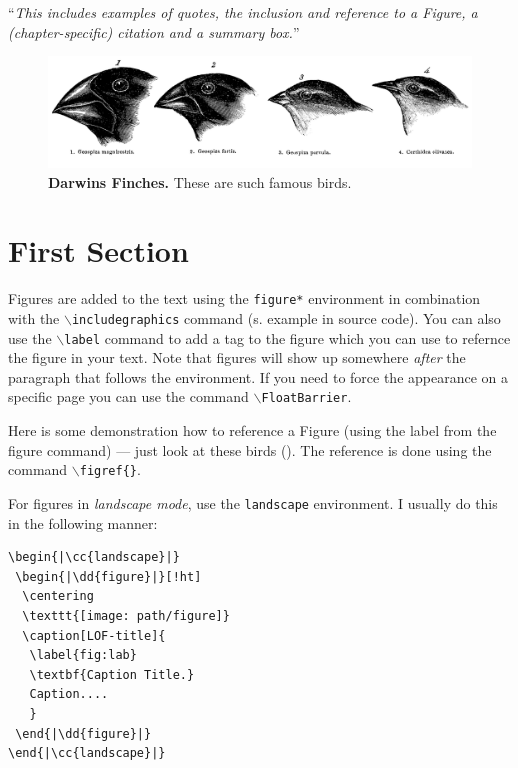 ``\textit{This includes examples of quotes, the inclusion and reference to a Figure, a (chapter-specific) citation and a summary box.}''\\

\begin{multicols}{2}
\begin{figure}[!hb] %
\centering
\includegraphics[width = \fwidth]{figures/ci/finches.png}
\caption[Darwins Finches]{\label{fig:cif1}\textbf{Darwins Finches.} These are such famous birds.
}
\end{figure}

\section{First Section}

Figures are added to the text using the \texttt{figure*} environment in combination with the \texttt{$\backslash$includegraphics} command (s. example in source code).
You can also use the \texttt{$\backslash$label} command to add a tag to the figure which you can use to refernce the figure in your text.
Note that figures will show up somewhere \textit{after} the paragraph that follows the  environment. If you need to force the appearance on a specific page you can use the command \texttt{$\backslash$FloatBarrier}.

Here is some demonstration how to reference a Figure (using the label from the figure command) --- just look at these birds ().
The reference is done using the command \texttt{$\backslash$figref\{\}}.

For figures in \textit{landscape mode}, use the \texttt{landscape} environment.
I usually do this in the following manner:\vspace*{-.5em}

\coderule\vspace*{-.8em}
\begin{lstlisting}
\begin{|\cc{landscape}|}
 \begin{|\dd{figure}|}[!ht]
  \centering
  \texttt{[image: path/figure]}
  \caption[LOF-title]{
   \label{fig:lab}
   \textbf{Caption Title.}
   Caption....
   }
 \end{|\dd{figure}|}
\end{|\cc{landscape}|}
\end{lstlisting}
\vspace*{-1.8em}
\coderule


\end{multicols}
